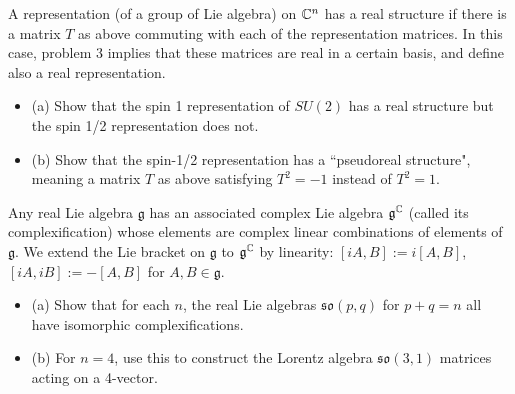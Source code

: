 \documentclass{article}
\begin{document}
\bigskip
\begin{prob}
    A representation (of a group of Lie algebra) on $\mathbb{C}^n$ has a real structure if there is a matrix $T$ as above commuting with each of the representation matrices. In this case, problem 3 implies that these matrices are real in a certain basis, and define also a real representation.
    \begin{itemize}
        \item (a) Show that the spin 1 representation of $SU(2)$ has a real structure but the spin 1/2 representation does not.
        \item (b) Show that the spin-1/2 representation has a ``pseudoreal structure", meaning a matrix $T$ as above satisfying $T^2=-1$ instead of $T^2=1$.
    \end{itemize}
\end{prob}

\bigskip
\begin{prob}
    Any real Lie algebra $\mathfrak{g}$ has an associated complex Lie algebra $\mathfrak{g}^{\mathbb{C}}$ (called its complexification) whose elements are complex linear combinations of elements of $\mathfrak{g}$. We extend the Lie bracket on $\mathfrak{g}$ to $\mathfrak{g}^{\mathbb{C}}$ by linearity: $[iA,B]:= i[A,B]$, $[iA,iB]:=-[A,B]$ for $A,B \in \mathfrak{g}$.
    \begin{itemize}
        \item (a) Show that for each $n$, the real Lie algebras $\mathfrak{so}(p,q)$ for $p+q=n$ all have isomorphic complexifications.
        \item (b) For $n=4$, use this to construct the Lorentz algebra $\mathfrak{so}(3,1)$ matrices acting on a 4-vector.
    \end{itemize}
\end{prob}
\end{document}
